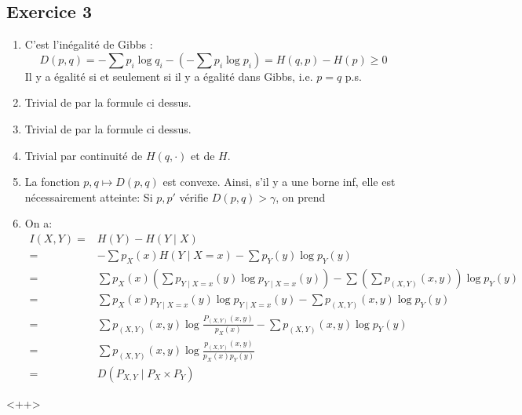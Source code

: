 \documentclass{cours}
\begin{document}
\subsection{Exercice 3}
\begin{enumerate}
	\item C'est l'inégalité de Gibbs : 
		\begin{equation*}
			D(p, q) =  -\sum p_{i}\log q_{i}  - \left(-\sum p_{i}\log p_{i}\right) = H(q, p) - H(p) \geq 0
		\end{equation*}
		Il y a égalité si et seulement si il y a égalité dans Gibbs, i.e. $p = q$ p.s.
	\item Trivial de par la formule ci dessus.
	\item Trivial de par la formule ci dessus.
	\item Trivial par continuité de $H(q, \cdot)$ et de $H$.
	\item La fonction $p, q \mapsto D(p, q)$ est convexe. Ainsi, s'il y a une borne inf, elle est nécessairement atteinte: Si $p, p'$ vérifie $D(p, q) > \gamma$, on prend  
	\item On a: 
		\begin{equation*}
			\begin{aligned}
				I(X, Y) =& H(Y) - H(Y \mid X)\\
				=& -\sum p_{X}(x)H(Y \mid X = x) - \sum p_{Y}(y)\log p_{Y}(y)\\
				=& \sum p_{X}(x) \left( \sum p_{Y \mid X = x}(y) \log p_{Y \mid X = x}(y) \right) - \sum \left(\sum p_{(X, Y)}(x, y)\right)\log p_{Y}(y)\\
				=& \sum p_{X}(x)p_{Y\mid X = x}(y) \log p_{Y\mid X = x}(y) - \sum p_{(X, Y)}(x, y) \log p_{Y}(y)\\
				=& \sum p_{(X, Y)}(x, y)\log \frac{P_{(X, Y)}(x, y)}{p_{X}(x)} - \sum p_{(X, Y)}(x, y)\log p_{Y}(y)\\
				=& \sum p_{(X, Y)}(x, y)\log \frac{p_{(X, Y)}(x, y)}{p_{X}(x)p_{Y}(y)}\\
				=& D(P_{X, Y}\mid P_{X}\times P_{Y})
			\end{aligned}
		\end{equation*}


\end{enumerate}<++>
\end{document}
